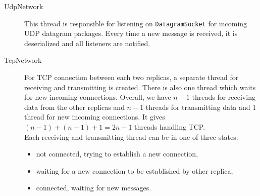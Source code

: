 \begin{description}
  \item[UdpNetwork] \hfill

    This thread is responsible for listening on \texttt{DatagramSocket} for incoming UDP datagram packages. Every time a new message is received, it is deserialized and all listeners are notified.

  \item[TcpNetwork] \hfill

    For TCP connection between each two replicas, a separate thread for receiving and transmitting is created. There is also  one thread which waits for new incoming connections.
    Overall, we have $n-1$ threads for receiving data from the other replicas and $n-1$ threads for transmitting data and 1 thread for new incoming connections. It gives $(n - 1) + (n - 1) + 1 = 2 n - 1$ threads handling TCP. \\
    Each receiving and transmitting thread can be in one of three states:
    \begin{itemize}
            \item not connected, trying to establish a new connection,
            \item waiting for a new connection to be established by other replica,
            \item connected, waiting for new messages.
    \end{itemize}
\end{description}
